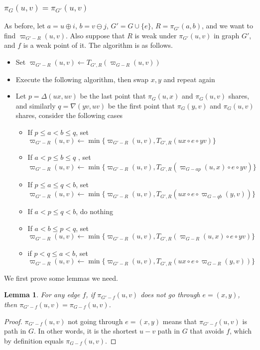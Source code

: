 \documentclass[11pt]{article}
\theoremstyle{plain}
\newtheorem{lemma}[theorem]{Lemma}
\theoremstyle{definition}
\newcommand{\new}[1]{\pi_{G'}(#1)}
\newcommand{\og}[3]{\pi_{G-#3}\left(#1,#2\right)}
\newcommand{\nng}[3]{\pi_{G'-#3}\left(#1,#2\right)}
\newcommand{\odg}[3]{\varpi_{G-#3}\left(#1,#2\right)}
\newcommand{\ndg}[3]{\varpi_{G'-#3}\left(#1,#2\right)}
\newcommand{\pp}[1]{T_{G',R}\left(#1\right)}
\begin{document}
\subsubsection{$\pi_G(u,v)=\pi_{G'}(u,v)$}\label{sec3-3-2}

As before, let $a = u \oplus i$, $b = v \ominus j$,  $G'=G\cup\{e\}$, $R=\new{a, b}$, and we want to find $\ndg{u}{v}{R}$. Also suppose that $R$ is weak under $\pi_{G'}(u,v)$ in graph $G'$, and $f$ is a weak point of it. The algorithm is as follows.





\begin{itemize}
    \item Set $\ndg{u}{v}{R}\leftarrow \pp{\odg{u}{v}{R}}$
    \item Execute the following algorithm, then swap $x,y$ and repeat again
    \item Let $p=\Delta(ux,uv)$ be the last point that $\pi_G(u,x)$ and $\pi_G(u,v)$ shares, and similarly $q=\nabla(yv,uv)$ be the first point that $\pi_G(y,v)$ and $\pi_G(u,v)$ shares, consider the following cases
    \begin{itemize}
        \item If $p\le a<b\le q$, set $\ndg{u}{v}{R}\leftarrow\min\{\ndg{u}{v}{R},\pp{ux\circ e\circ yv}\}$
        \item If $a<p\le b\le q$ , set $\ndg{u}{v}{R}\leftarrow\min\{\ndg{u}{v}{R},\pp{\odg{u}{x}{ap}\circ e\circ yv}\}$
        \item If $p\le a\le q< b$, set $\ndg{u}{v}{R}\leftarrow\min\{\ndg{u}{v}{R},\pp{ux\circ e\circ \odg{y}{v}{qb}}\}$
        \item If $a<p\le q<b$, do nothing
        \item If $a<b\le p<q$, set $\ndg{u}{v}{R}\leftarrow\min\{\ndg{u}{v}{R},\pp{\odg{u}{x}{R}\circ e\circ yv}\}$
        \item if $p<q\le a<b$, set $\ndg{u}{v}{R}\leftarrow\min\{\ndg{u}{v}{R},\pp{ux\circ e\circ\odg{y}{v}{R}}\}$
    \end{itemize}
\end{itemize}

We first prove some lemmas we need.
\begin{lemma}\label{lemma4-5}
    For any edge $f$, if $\nng{u}{v}{f}$ does not go through $e=(x,y)$, then $\nng{u}{v}{f}=\og{u}{v}{f}$.
\end{lemma}

\begin{proof}
    $\nng{u}{v}{f}$ not going through $e=(x,y)$ means that $\nng{u}{v}{f}$ is path in $G.$ In other words, it is the shortest $u-v$ path in $G$ that avoids $f$, which by definition equals $\og{u}{v}{f}.$
\end{proof}
\end{document}
